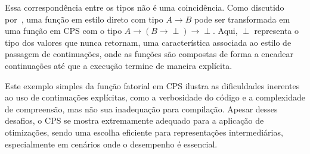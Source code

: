 Essa correspondência entre os tipos não é uma coincidência.
Como discutido por~, uma função em estilo direto com tipo $A \rightarrow B$ pode ser transformada em uma função em CPS com o tipo $A \rightarrow (B \rightarrow \perp) \rightarrow \perp$.
Aqui, $\perp$ representa o tipo dos valores que nunca retornam, uma característica associada ao estilo de passagem de continuações, onde as funções são compostas de forma a encadear continuações até que a execução termine de maneira explícita.

Este exemplo simples da função fatorial em CPS ilustra as dificuldades inerentes ao uso de continuações explícitas, como a verbosidade do código e a complexidade de compreensão, mas não sua inadequação para compilação.
Apesar desses desafios, o CPS se mostra extremamente adequado para a aplicação de otimizações, sendo uma escolha eficiente para representações intermediárias, especialmente em cenários onde o desempenho é essencial.

